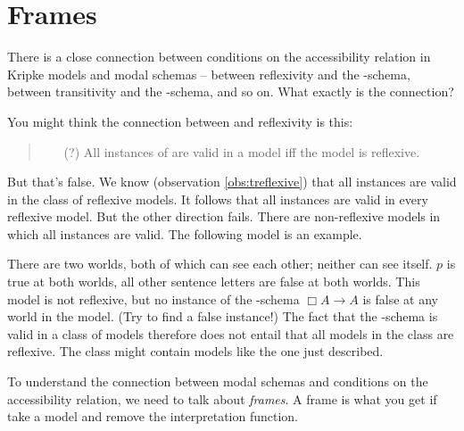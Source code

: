 

\section{Frames}\label{sec:frames}

There is a close connection between conditions on the accessibility relation in
Kripke models and modal schemas -- between reflexivity and the -schema,
between transitivity and the -schema, and so on. What exactly is the
connection?

You might think the connection between  and reflexivity is this:
\begin{quote}
  \begin{itemize}
    \item[(?)] All instances of  are valid in a model iff the model is reflexive.
  \end{itemize}
\end{quote}
%
But that's false. We know (observation \ref{obs:treflexive}) that all 
instances are valid in the class of reflexive models. It follows that all 
instances are valid in every reflexive model. But the other direction fails.
There are non-reflexive models in which all  instances are valid. The
following model is an example.
\begin{center}
\end{center}
There are two worlds, both of which can see each other; neither can see itself.
$p$ is true at both worlds, all other sentence letters are false at both worlds.
This model is not reflexive, but no instance of the -schema $\Box A \to A$
is false at any world in the model. (Try to find a false instance!) The fact
that the -schema is valid in a class of models therefore does not entail
that all models in the class are reflexive. The class might contain models like
the one just described.

To understand the connection between modal schemas and conditions on the
accessibility relation, we need to talk about \emph{frames}. A frame is what you
get if take a model and remove the interpretation function.

